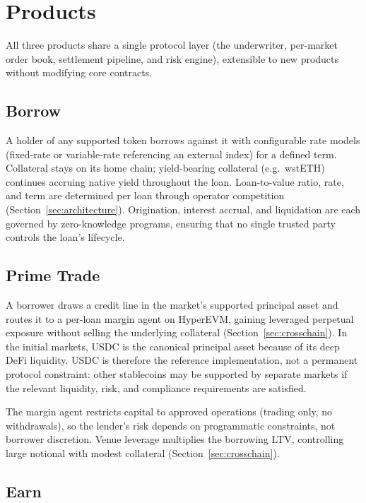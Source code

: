 \section{Products}
\label{sec:products}

All three products share a single protocol layer (the underwriter, per-market order book, settlement pipeline, and risk engine), extensible to new products without modifying core contracts.

\subsection{Borrow}

A holder of any supported token borrows against it with configurable rate models (fixed-rate or variable-rate referencing an external index) for a defined term. Collateral stays on its home chain; yield-bearing collateral (e.g.\ wstETH) continues accruing native yield throughout the loan. Loan-to-value ratio, rate, and term are determined per loan through operator competition (Section~\ref{sec:architecture}). Origination, interest accrual, and liquidation are each governed by zero-knowledge programs, ensuring that no single trusted party controls the loan's lifecycle.

\subsection{Prime Trade}

A borrower draws a credit line in the market's supported principal asset and routes it to a per-loan margin agent on HyperEVM, gaining leveraged perpetual exposure without selling the underlying collateral (Section~\ref{sec:crosschain}). In the initial markets, USDC is the canonical principal asset because of its deep DeFi liquidity. USDC is therefore the reference implementation, not a permanent protocol constraint: other stablecoins may be supported by separate markets if the relevant liquidity, risk, and compliance requirements are satisfied.

The margin agent restricts capital to approved operations (trading only, no withdrawals), so the lender's risk depends on programmatic constraints, not borrower discretion. Venue leverage multiplies the borrowing LTV, controlling large notional with modest collateral (Section~\ref{sec:crosschain}).

\subsection{Earn}


